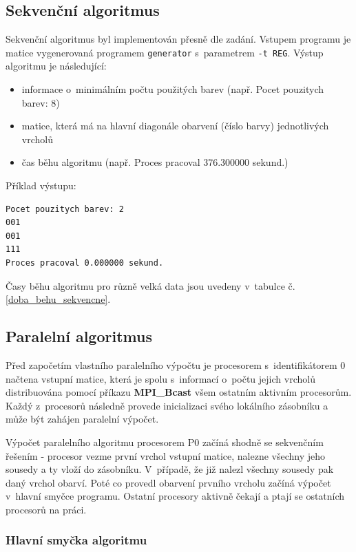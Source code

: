 \documentclass[12pt]{article}
\begin{document}
\subsection{Sekvenční algoritmus}
Sekvenční algoritmus byl implementován přesně dle zadání. Vstupem programu je matice vygenerovaná programem \texttt{generator} s~parametrem \texttt{-t REG}. Výstup algoritmu je následující:
\begin{itemize}
\item informace o~minimálním počtu použitých barev (např. Pocet pouzitych barev: 8)
\item matice, která má na hlavní diagonále obarvení (číslo barvy) jednotlivých vrcholů
\item čas běhu algoritmu (např. Proces pracoval 376.300000 sekund.)
\end{itemize}

Příklad výstupu:
\begin{verbatim}
Pocet pouzitych barev: 2
001
001
111
Proces pracoval 0.000000 sekund.
\end{verbatim}

Časy běhu algoritmu pro různě velká data jsou uvedeny v~tabulce č. \ref{doba_behu_sekvencne}.

\subsection{Paralelní algoritmus}

Před započetím vlastního paralelního výpočtu je procesorem s~identifikátorem 0 načtena vstupní matice, která je spolu s~informací o~počtu jejich vrcholů distribuována pomocí příkazu \textbf{MPI\_Bcast} všem ostatním aktivním procesorům. Každý z~procesorů následně provede inicializaci svého lokálního zásobníku a může být zahájen paralelní výpočet.

Výpočet paralelního algoritmu procesorem P0 začíná shodně se sekvenčním řešením - procesor vezme první vrchol vstupní matice, nalezne všechny jeho sousedy a ty vloží do zásobníku. V~případě, že již nalezl všechny sousedy pak daný vrchol obarví. Poté co provedl obarvení prvního vrcholu začíná výpočet v~hlavní smyčce programu. Ostatní procesory aktivně čekají a ptají se ostatních procesorů na práci.

\subsubsection{Hlavní smyčka algoritmu}
\end{document}
